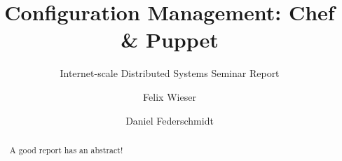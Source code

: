 \documentclass[sigconf]{acmart}
\begin{document}
\title{Configuration Management: Chef \& Puppet}
\subtitle{Internet-scale Distributed Systems Seminar Report}


\author{Felix Wieser}

\author{Daniel Federschmidt}


\renewcommand{\shortauthors}{F. Wieser et al.}


\begin{abstract}

A good report has an abstract!

\end{abstract}


\maketitle







\end{document}
